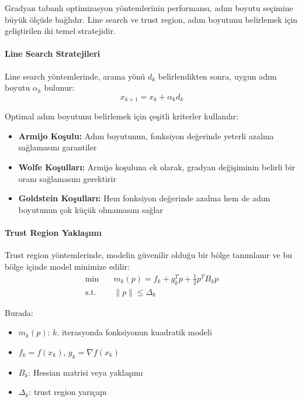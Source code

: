 Gradyan tabanlı optimizasyon yöntemlerinin performansı, adım boyutu seçimine büyük ölçüde bağlıdır. Line search ve trust region, adım boyutunu belirlemek için geliştirilen iki temel stratejidir.

\paragraph{Line Search Stratejileri}
Line search yöntemlerinde, arama yönü $d_k$ belirlendikten sonra, uygun adım boyutu $\alpha_k$ bulunur:
\begin{equation}
x_{k+1} = x_k + \alpha_k d_k
\end{equation}

Optimal adım boyutunu belirlemek için çeşitli kriterler kullanılır:
\begin{itemize}
    \item \textbf{Armijo Koşulu:} Adım boyutunun, fonksiyon değerinde yeterli azalma sağlamasını garantiler
    \item \textbf{Wolfe Koşulları:} Armijo koşuluna ek olarak, gradyan değişiminin belirli bir oranı sağlamasını gerektirir
    \item \textbf{Goldstein Koşulları:} Hem fonksiyon değerinde azalma hem de adım boyutunun çok küçük olmamasını sağlar
\end{itemize}

\paragraph{Trust Region Yaklaşımı}
Trust region yöntemlerinde, modelin güvenilir olduğu bir bölge tanımlanır ve bu bölge içinde model minimize edilir:
\begin{equation}
\begin{aligned}
\min & \quad m_k(p) = f_k + g_k^Tp + \frac{1}{2}p^TB_kp \\
\text{s.t.} & \quad \|p\| \leq \Delta_k
\end{aligned}
\end{equation}

Burada:
\begin{itemize}
    \item $m_k(p)$: $k$. iterasyonda fonksiyonun kuadratik modeli
    \item $f_k = f(x_k)$, $g_k = \nabla f(x_k)$
    \item $B_k$: Hessian matrisi veya yaklaşımı
    \item $\Delta_k$: trust region yarıçapı
\end{itemize}

